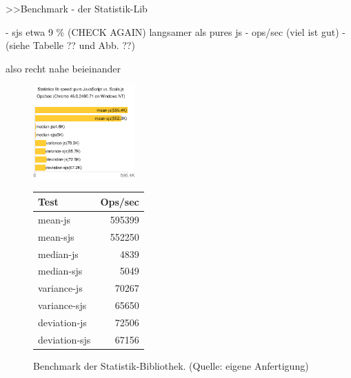 \documentclass[a4paper, 12pt, hidelinks, listof=totoc, listoftables=totoc, bibliography=totoc]{scrreprt}
\begin{document}
>>Benchmark - der Statistik-Lib

- sjs etwa 9 \% (CHECK AGAIN) langsamer als pures js
- ops/sec (viel ist gut)
- (siehe Tabelle ?? und Abb. ??)

also recht nahe beieinander


\begin{figure}[!h]
	\centering
	\includegraphics[width=0.35\textwidth]{statistics-lib/benchmark-statistics-lib-chart}
	\qquad
	\qquad
	\begin{tabular}[b]{|l|r|}
		\hline \textbf{Test} & \textbf{Ops/sec} \\ 
		\hline mean-js       & 595399 \\ 
		\hline mean-sjs      & 552250 \\ 
		\hline median-js     & 4839 \\ 
		\hline median-sjs    & 5049 \\ 
		\hline variance-js   & 70267 \\ 
		\hline variance-sjs  & 65650 \\ 
		\hline deviation-js  & 72506 \\ 
		\hline deviation-sjs & 67156 \\ 
		\hline 
	\end{tabular}
	\captionsetup{labelformat=andtable}
	\caption{Benchmark der Statistik-Bibliothek. (Quelle: eigene Anfertigung)}
\end{figure}
\end{document}
